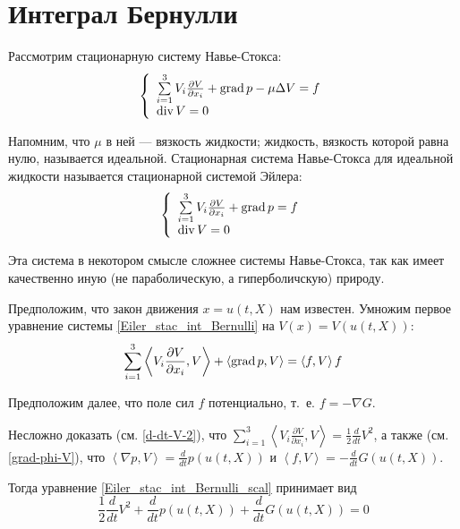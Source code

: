 \section{Интеграл Бернулли}
Рассмотрим стационарную систему Навье-Стокса:
\begin{equation*}
	\left\{
		\begin{array}{l}
		\sum\limits_{i=1}^{3}V_i\frac{\partial V}{\partial x_i}
		+ \operatorname{grad} p - \mu \Delta V = f
		\\
		\operatorname{div} V = 0
		\end{array}
	\right.
\end{equation*}

Напомним, что $\mu$ в ней --- вязкость жидкости;
жидкость, вязкость которой равна нулю, называется идеальной.
Стационарная система Навье-Стокса для идеальной жидкости называется стационарной системой Эйлера:
\begin{equation*} \label{Eiler_stac_int_Bernulli}
	\left\{
		\begin{array}{l}
		\sum\limits_{i=1}^{3}V_i\frac{\partial V}{\partial x_i}
		+ \operatorname{grad} p = f
		\\
		\operatorname{div} V = 0
		\end{array}
	\right.
\end{equation*}

Эта система в некотором смысле сложнее системы Навье-Стокса,
так как имеет качественно иную (не параболическую, а гиперболичскую) природу.

Предположим, что закон движения $x=u(t,X)$ нам известен.
Умножим первое уравнение системы \eqref{Eiler_stac_int_Bernulli} на $V(x) = V(u(t,X))$:
\begin{equation} \label{Eiler_stac_int_Bernulli_scal}
	\sum\limits_{i=1}^{3}\left<V_i\frac{\partial V}{\partial x_i} , V \right>
	+ \left< \operatorname{grad} p , V \right> = \left< f , V \right>f
\end{equation}

Предположим далее, что поле сил $f$ потенциально, т.~е. $f = - \nabla G$.

Несложно доказать (см. \eqref{d-dt-V-2}), что
$\sum\limits_{i=1}^{3} \left< V_i \frac{\partial V}{\partial x_i}, V \right> = \frac{1}{2} \frac{d}{dt}V^2$,
а также (см. \eqref{grad-phi-V}), что
$\left< \nabla p , V\right> = \frac{d}{dt}p (u(t,X))$
и $\left< f , V\right> = - \frac{d}{dt}G (u(t,X))$.

Тогда уравнение \eqref{Eiler_stac_int_Bernulli_scal} принимает вид
\begin{equation*}
	\frac{1}{2} \frac{d}{dt}V^2 + \frac{d}{dt}p (u(t,X)) + \frac{d}{dt}G (u(t,X)) = 0
\end{equation*}

